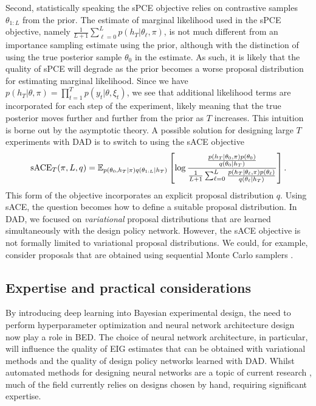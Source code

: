 \documentclass[a4paper, 10pt]{report}
\theoremstyle{plain}
\begin{document}
	Second, statistically speaking the sPCE objective relies on contrastive samples $\theta_{1:L}$ from the prior.
	The estimate of marginal likelihood used in the sPCE objective, namely $\frac{1}{L+1}\sum_{\ell=0}^L p(h_T|\theta_\ell,\pi)$, is not much different from an importance sampling estimate using the prior, although with the distinction of using the true posterior sample $\theta_0$ in the estimate.
	As such, it is likely that the quality of sPCE will degrade as the prior becomes a worse proposal distribution for estimating marginal likelihood. Since we have $p(h_T|\theta,\pi) = \prod_{t=1}^T p(y_t|\theta,\xi_t)$, we see that additional likelihood terms are incorporated for each step of the experiment, likely meaning that the true posterior moves further and further from the prior as $T$ increases. This intuition is borne out by the asymptotic theory.
	A possible solution for designing large $T$ experiments with DAD is to switch to using the sACE objective
	\begin{equation}
	\text{sACE}_T(\pi,L,q) = \mathbb{E}_{p(\theta_0,h_T|\pi)q(\theta_{1:L}|h_T)}\left[\log \frac{\frac{p(h_T|\theta_0,\pi)p(\theta_0)}{q(\theta_0|h_T)}}{\frac{1}{L+1}\sum_{\ell=0}^L \frac{p(h_T|\theta_\ell,\pi)p(\theta_\ell)}{q(\theta_\ell|h_T)}}\right].
	\end{equation}
	This form of the objective incorporates an explicit proposal distribution $q$.
	Using sACE, the question becomes how to define a suitable proposal distribution.
	In DAD, we focused on \emph{variational} proposal distributions that are learned simultaneously with the design policy network. However, the sACE objective is not formally limited to variational proposal distributions. We could, for example, consider proposals that are obtained using sequential Monte Carlo samplers \citep{del2006sequential}.
	
	

	
	\subsection{Expertise and practical considerations}
	By introducing deep learning into Bayesian experimental design, the need to perform hyperparameter optimization \citep{bergstra2011algorithms} and neural network architecture design now play a role in BED.
	The choice of neural network architecture, in particular, will influence the quality of EIG estimates that can be obtained with variational methods and the quality of design policy networks learned with DAD.
	Whilst automated methods for designing neural networks are a topic of current research \citep{baker2016designing}, much of the field currently relies on designs chosen by hand, requiring significant expertise.
	
\end{document}

